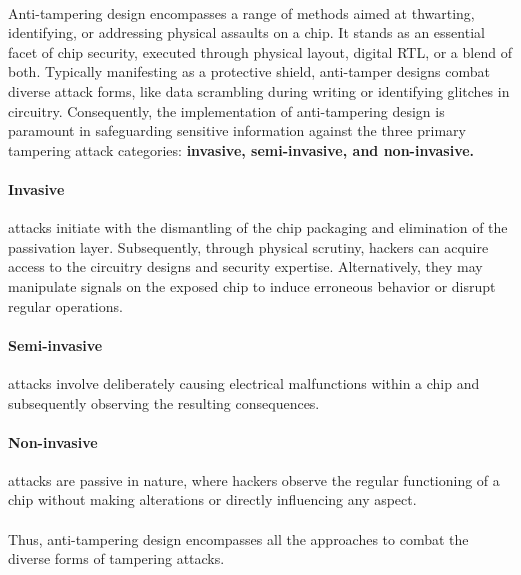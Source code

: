 \paragraph*{}
Anti-tampering design encompasses a range of methods aimed at thwarting, identifying, or addressing physical assaults on a chip. It stands as an essential facet of chip security, executed through physical layout, digital RTL, or a blend of both. Typically manifesting as a protective shield, anti-tamper designs combat diverse attack forms, like data scrambling during writing or identifying glitches in circuitry. Consequently, the implementation of anti-tampering design is paramount in safeguarding sensitive information against the three primary tampering attack categories: \textbf{invasive, semi-invasive, and non-invasive.}
\paragraph*{Invasive}
 attacks initiate with the dismantling of the chip packaging and elimination of the passivation layer. Subsequently, through physical scrutiny, hackers can acquire access to the circuitry designs and security expertise. Alternatively, they may manipulate signals on the exposed chip to induce erroneous behavior or disrupt regular operations.
 \paragraph*{Semi-invasive}
 attacks involve deliberately causing electrical malfunctions within a chip and subsequently observing the resulting consequences.
\paragraph*{Non-invasive}
attacks are passive in nature, where hackers observe the regular functioning of a chip without making alterations or directly influencing any aspect.
\paragraph*{}
Thus, anti-tampering design encompasses all the approaches to combat the diverse forms of tampering attacks.
